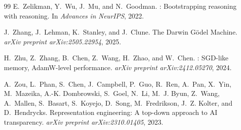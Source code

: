 \documentclass[11pt,a4paper]{article}
\begin{document}
\begin{thebibliography}{99}
E.~Zelikman, Y.~Wu, J.~Mu, and N.~Goodman.
: Bootstrapping reasoning with reasoning.
\newblock In \emph{Advances in NeurIPS}, 2022.

J.~Zhang, J.~Lehman, K.~Stanley, and J.~Clune.
\newblock The Darwin G\"odel Machine.
\newblock \emph{arXiv preprint arXiv:2505.22954}, 2025.

H.~Zhu, Z.~Zhang, B.~Chen, Z.~Wang, H.~Zhao, and W.~Chen.
: SGD-like memory, AdamW-level performance.
\newblock \emph{arXiv preprint arXiv:2412.05270}, 2024.

A.~Zou, L.~Phan, S.~Chen, J.~Campbell, P.~Guo, R.~Ren, A.~Pan, X.~Yin, M.~Mazeika, A.-K. Dombrowski, S.~Goel, N.~Li, M.~J. Byun, Z.~Wang, A.~Mallen, S.~Basart, S.~Koyejo, D.~Song, M.~Fredrikson, J.~Z. Kolter, and D.~Hendrycks.
\newblock Representation engineering: A top-down approach to AI transparency.
\newblock \emph{arXiv preprint arXiv:2310.01405}, 2023.

\end{thebibliography}
\end{document}
